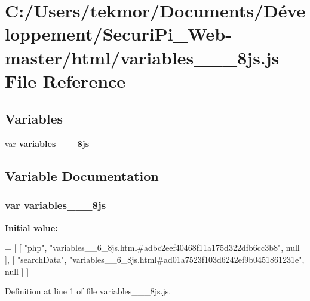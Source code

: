 \section{C\+:/\+Users/tekmor/\+Documents/\+Développement/\+Securi\+Pi\+\_\+\+Web-\/master/html/variables\+\_\+\+\_\+\_\+8js.js File Reference}
\label{variables____6__8js_8js}
\subsection*{Variables}
\begin{DoxyCompactItemize}
\item 
var {\bf variables\+\_\+\+\_\+\_\+8js}
\end{DoxyCompactItemize}


\subsection{Variable Documentation}
\subsubsection[{variables\+\_\+\+\_\+6\+\_\+8js}]{\setlength{\rightskip}{0pt plus 5cm}var variables\+\_\+\+\_\+\_\+8js}\label{variables____6__8js_8js_acb406a5340859bf15ed16c917b313952}
{\bfseries Initial value\+:}
\begin{DoxyCode}
=
[
    [ \textcolor{stringliteral}{"php"}, \textcolor{stringliteral}{"variables\_\_6\_8js.html#adbc2eef40468f11a175d322dfb6cc3b8"}, null ],
    [ \textcolor{stringliteral}{"searchData"}, \textcolor{stringliteral}{"variables\_\_6\_8js.html#ad01a7523f103d6242ef9b0451861231e"}, null ]
]
\end{DoxyCode}


Definition at line 1 of file variables\+\_\+\+\_\+\_\+8js.\+js.

